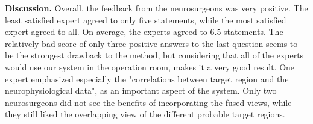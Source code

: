 \documentclass[journal]{vgtc}                %
\begin{document}

\noindent \textbf{Discussion.} Overall, the feedback from the neurosurgeons was very positive. The least satisfied expert agreed to only five statements, while the most satisfied expert agreed to all. On average, the experts agreed to $6.5$ statements. The relatively bad score of only three positive answers to the last question seems to be the strongest drawback to the method, but considering that all of the experts would use our system in the operation room, makes it a very good result. One expert emphasized especially the "correlations between target region and the neurophysiological data", as an important aspect of the system. Only two neurosurgeons did not see the benefits of incorporating the fused views, while they still liked the overlapping view of the different probable target regions.
\end{document}
